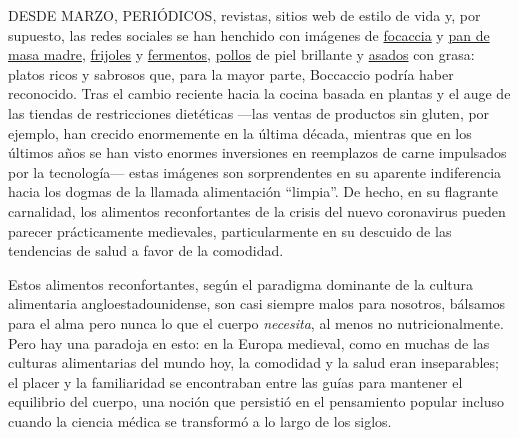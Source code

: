 DESDE MARZO, PERIÓDICOS, revistas, sitios web de estilo de vida y, por
supuesto, las redes sociales se han henchido con imágenes de
\href{https://www.nytimes.com/2020/04/24/dining/focaccia-bread.html}{focaccia}
y
\href{https://www.nytimes.com/2020/04/11/science/sourdough-bread-starter-library.html}{pan
de masa madre},
\href{https://www.nytimes.com/2020/03/22/business/coronavirus-beans-sales.html}{frijoles}
y
\href{https://www.nytimes.com/2020/04/07/realestate/home-farming-tips-coronavirus.html}{fermentos},
\href{https://www.nytimes.com/2020/07/03/dining/the-most-delicious-chicken.html}{pollos}
de piel brillante y
\href{https://cooking.nytimes.com/recipes/1020845-slow-cooker-pot-roast}{asados}
con grasa: platos ricos y sabrosos que, para la mayor parte, Boccaccio
podría haber reconocido. Tras el cambio reciente hacia la cocina basada
en plantas y el auge de las tiendas de restricciones dietéticas ---las
ventas de productos sin gluten, por ejemplo, han crecido enormemente en
la última década, mientras que en los últimos años se han visto enormes
inversiones en reemplazos de carne impulsados por la tecnología--- estas
imágenes son sorprendentes en su aparente indiferencia hacia los dogmas
de la llamada alimentación ``limpia''. De hecho, en su flagrante
carnalidad, los alimentos reconfortantes de la crisis del nuevo
coronavirus pueden parecer prácticamente medievales, particularmente en
su descuido de las tendencias de salud a favor de la comodidad.

Estos alimentos reconfortantes, según el paradigma dominante de la
cultura alimentaria angloestadounidense, son casi siempre malos para
nosotros, bálsamos para el alma pero nunca lo que el cuerpo
\emph{necesita}, al menos no nutricionalmente. Pero hay una paradoja en
esto: en la Europa medieval, como en muchas de las culturas alimentarias
del mundo hoy, la comodidad y la salud eran inseparables; el placer y la
familiaridad se encontraban entre las guías para mantener el equilibrio
del cuerpo, una noción que persistió en el pensamiento popular incluso
cuando la ciencia médica se transformó a lo largo de los siglos.

